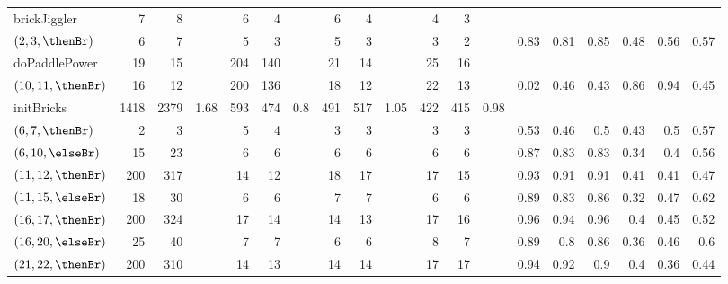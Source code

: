 \begin{table}
\begin{tabular}{l|rrr|rrr|rrr|rrr|rrrrrr}
    \midrule
    \midrule
    brickJiggler       & 7    & 8 &                      & 6  & 4 &                        & 6 & 4       &                     & 4 & 3     & &      &      &      &      &      &\\
    $(2,3,\thenBr)$    & 6    & 7 &                      & 5  & 3 &                        & 5 & 3       &                     & 3 & 2     & & 0.83 & 0.81 & 0.85 & 0.48 & 0.56 & 0.57 \\
    \midrule
    doPaddlePower      & 19   & 15 &                     & 204  & 140 &                    & 21 & 14     &                     & 25 & 16   & &     &      &      &      &      & \\
    $(10,11,\thenBr)$  & 16   & 12 &                     & 200  & 136 &                    & 18 & 12     &                     & 22 & 13   & &  0.02 & 0.46 & 0.43 & 0.86 & 0.94 & 0.45 \\
    \midrule
    initBricks         & 1418 & 2379 & 1.68              & 593  & 474 & 0.8                & 491   & 517 & 1.05                & 422 & 415 & 0.98 &   &            &            &     &             & \\
    $(6,7,\thenBr)$    & 2    & 3    &                   & 5    & 4   &                    & 3     & 3   &                     & 3   & 3   & & 0.53 & 0.46 & 0.5 & 0.43   & 0.5  & 0.57 \\
    $(6,10,\elseBr)$   & 15   & 23   &                   & 6    & 6   &                    & 6     & 6   &                     & 6   & 6   & & 0.87 & 0.83 & 0.83 & 0.34 & 0.4  & 0.56 \\
    $(11,12,\thenBr)$  & 200  & 317  &                   & 14   & 12  &                    & 18    & 17  &                     & 17  & 15  & & 0.93  & 0.91 & 0.91 & 0.41  & 0.41 & 0.47 \\
    $(11,15,\elseBr)$  & 18   & 30   &                   & 6    & 6   &                    & 7     & 7   &                     & 6   & 6   & & 0.89 & 0.83 & 0.86 & 0.32 & 0.47 & 0.62 \\
    $(16,17,\thenBr)$  & 200  & 324  &                   & 17   & 14  &                    & 14    & 13  &                     & 17  & 16  & & 0.96 & 0.94 & 0.96 & 0.4  & 0.45 & 0.52 \\
    $(16,20,\elseBr)$  & 25   & 40   &                   & 7    & 7   &                    & 6     & 6   &                     & 8   & 7   & & 0.89 & 0.8  & 0.86 & 0.36 & 0.46 & 0.6 \\
    $(21,22,\thenBr)$  & 200  & 310  &                   & 14   & 13  &                    & 14    & 14  &                     & 17  & 17  & & 0.94 & 0.92 & 0.9  & 0.4   & 0.36 & 0.44 \\

\end{tabular}
\end{table}
